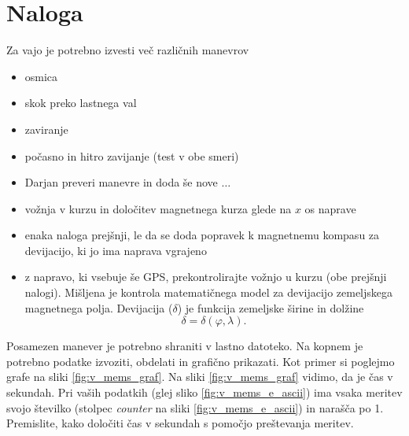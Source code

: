 \newpage
\section{Naloga}
Za vajo je potrebno izvesti več različnih manevrov
\begin{itemize}
	\item osmica
	\item skok preko lastnega val
	\item zaviranje
	\item počasno in hitro zavijanje (test v obe smeri)
	\item Darjan preveri manevre in doda še nove $\ldots$
	\item vožnja v kurzu in določitev magnetnega kurza glede na $x$ os naprave
	\item enaka naloga prejšnji, le da se doda popravek k magnetnemu kompasu za devijacijo, ki jo ima naprava vgrajeno
	\item z napravo, ki vsebuje še GPS, prekontrolirajte vožnjo u kurzu (obe prejšnji nalogi). Mišljena je kontrola matematičnega model za devijacijo zemeljskega magnetnega polja. Devijacija ($\delta$) je funkcija zemeljske širine in dolžine 
	\[
	\delta = \delta(\varphi,\lambda).
	\]
\end{itemize}

\noindent
Posamezen manever je potrebno shraniti v lastno datoteko. Na kopnem je potrebno podatke izvoziti, obdelati in grafično prikazati. Kot primer si poglejmo grafe na sliki \ref{fig:v_mems_graf}. Na sliki \ref{fig:v_mems_graf} vidimo, da je čas v sekundah. Pri vaših podatkih (glej sliko \ref{fig:v_mems_e_ascii}) ima vsaka meritev svojo številko (stolpec \emph{counter} na sliki \ref{fig:v_mems_e_ascii}) in narašča po 1. Premislite, kako določiti čas v sekundah s pomočjo preštevanja meritev.  

